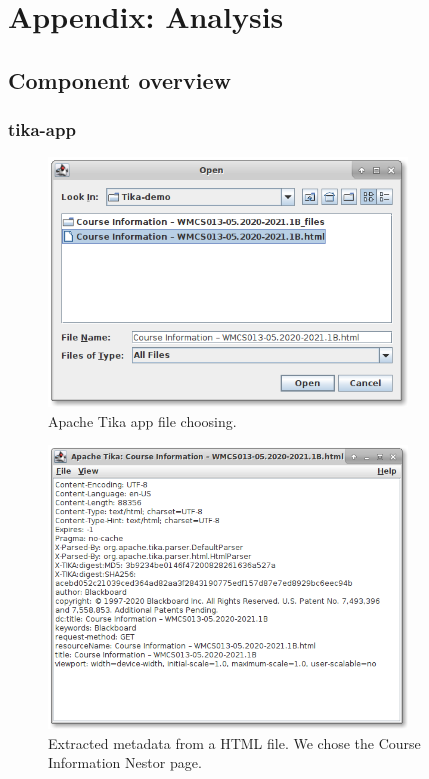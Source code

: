 \documentclass{article}
\begin{document}
\appendix
\section{Appendix: Analysis}
\subsection{Component overview}
\subsubsection{tika-app}
\begin{figure}[ht]
    \centering
    \includegraphics[width=0.85\textwidth]{report/images/tika_app/filechooser.png}
    \caption{Apache Tika app file choosing.}
    \label{fig:tika_app/filechooser}
\end{figure}
\begin{figure}[ht]
    \centering
    \includegraphics[width=0.85\textwidth]{report/images/tika_app/metadata.png}
    \caption{Extracted metadata from a HTML file. We chose the Course Information Nestor page.}
    \label{fig:tika_app/metadata}
\end{figure}
\end{document}
